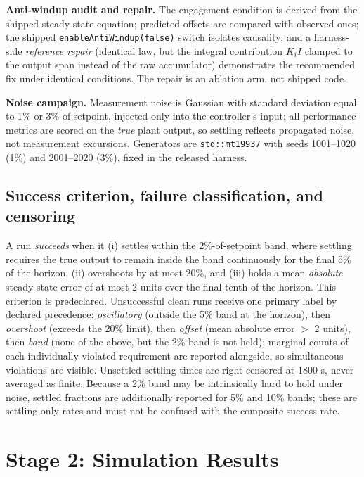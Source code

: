 \documentclass[10pt,twocolumn]{article}
\begin{document}
\textbf{Anti-windup audit and repair.} The engagement condition is derived from the shipped steady-state equation; predicted offsets are compared with observed ones; the shipped \texttt{enableAntiWindup(false)} switch isolates causality; and a harness-side \emph{reference repair} (identical law, but the integral contribution $K_i I$ clamped to the output span instead of the raw accumulator) demonstrates the recommended fix under identical conditions. The repair is an ablation arm, not shipped code.

\textbf{Noise campaign.} Measurement noise is Gaussian with standard deviation equal to 1\% or 3\% of setpoint, injected only into the controller's input; all performance metrics are scored on the \emph{true} plant output, so settling reflects propagated noise, not measurement excursions. Generators are \texttt{std::mt19937} with seeds 1001--1020 (1\%) and 2001--2020 (3\%), fixed in the released harness.

\subsection{Success criterion, failure classification, and censoring}

A run \emph{succeeds} when it (i) settles within the 2\%-of-setpoint band, where settling requires the true output to remain inside the band continuously for the final 5\% of the horizon, (ii) overshoots by at most 20\%, and (iii) holds a mean \emph{absolute} steady-state error of at most 2 units over the final tenth of the horizon. This criterion is predeclared. Unsuccessful clean runs receive one primary label by declared precedence: \emph{oscillatory} (outside the 5\% band at the horizon), then \emph{overshoot} (exceeds the 20\% limit), then \emph{offset} (mean absolute error $>$ 2 units), then \emph{band} (none of the above, but the 2\% band is not held); marginal counts of each individually violated requirement are reported alongside, so simultaneous violations are visible. Unsettled settling times are right-censored at 1800 s, never averaged as finite. Because a 2\% band may be intrinsically hard to hold under noise, settled fractions are additionally reported for 5\% and 10\% bands; these are settling-only rates and must not be confused with the composite success rate.

\section{Stage 2: Simulation Results}
\label{sec:results}
\end{document}
